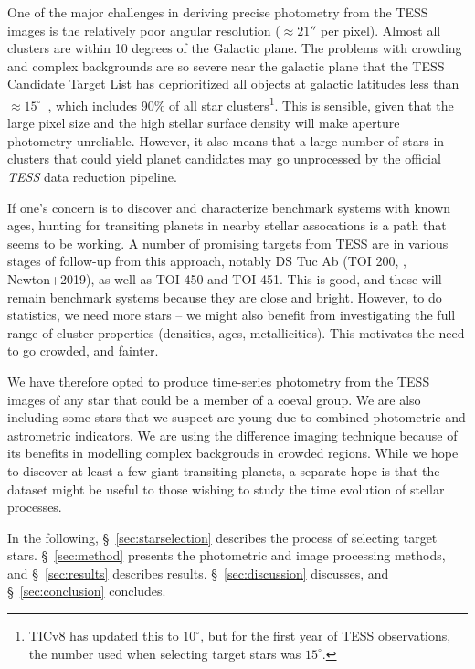 \documentclass[12pt,twocolumn,tighten]{aastex62}
\begin{document}
One of the major challenges in deriving precise photometry from the
TESS images is the relatively poor angular resolution ($\approx 21''$
per pixel).  Almost all clusters are within 10 degrees of the Galactic
plane. The problems with crowding and complex backgrounds are so
severe near the galactic plane that the TESS Candidate Target List has
deprioritized all objects at galactic latitudes less than $\approx
15^\circ$~\citep{stassun_TIC_2018,stassun_TIC8_2019}, which includes
90\% of all star clusters\footnote{TICv8 has updated this to $10^\circ$,
but for the first year of TESS observations, the number used when
selecting target stars was $15^\circ$.}.  This is sensible, given that
the large pixel size and the high stellar surface density will make
aperture photometry unreliable.  However, it also means that a large
number of stars in clusters that could yield planet candidates may go
unprocessed by the official {\it TESS} data reduction pipeline.

If one's concern is to discover and characterize benchmark systems
with known ages,
hunting for transiting planets in nearby stellar assocations is a path
that seems to be working.  A number of promising targets from TESS are
in various stages of follow-up from this approach, notably DS Tuc Ab
(TOI 200, \citealt{benatti_dstuc_2019}, Newton+2019), as well as
TOI-450 and TOI-451.  This is good, and these will remain benchmark
systems because they are close and bright.  However, to do statistics,
we need more stars -- we might also benefit from investigating the full range of cluster
properties (densities, ages, metallicities).  This motivates the need
to go crowded, and fainter.

We have therefore opted to produce time-series photometry from the
TESS images of any star that could be a member of a coeval group.  We
are also including some stars that we suspect are young due to
combined photometric and astrometric indicators.  We are using the
difference imaging technique because of its benefits in modelling
complex backgrouds in crowded regions.  While we hope to
discover at least a few giant transiting planets, a separate hope
is that the dataset might be useful to those wishing to study the
time evolution of stellar processes.

In the following, \S~\ref{sec:starselection} describes the process of
selecting target stars.  \S~\ref{sec:method} presents the photometric and
image processing methods, and \S~\ref{sec:results} describes results.
\S~\ref{sec:discussion} discusses, and \S~\ref{sec:conclusion}
concludes.
\end{document}
